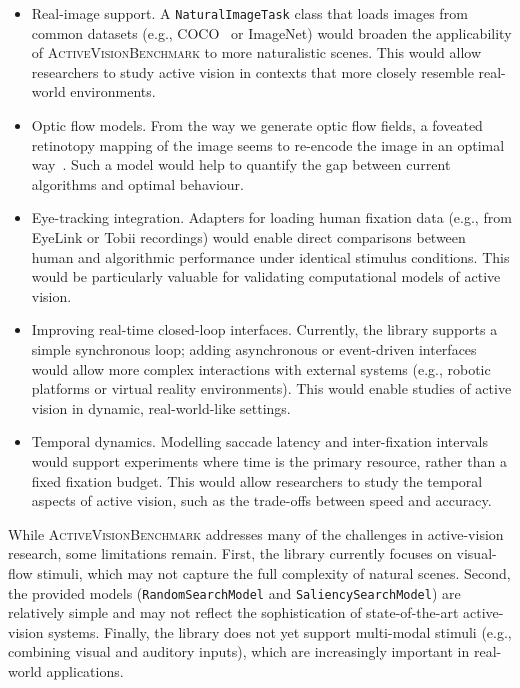 \documentclass[12pt,a4paper]{article}
\newcommand{\avb}{\textsc{ActiveVisionBenchmark}}  %
\begin{document}
\begin{itemize}
    \item Real-image support. A \texttt{NaturalImageTask} class that loads images from common datasets (e.g., COCO~\parencite{Lin2014} or ImageNet) would broaden the applicability of \avb{} to more naturalistic scenes. This would allow researchers to study active vision in contexts that more closely resemble real-world environments.

    \item Optic flow models. From the way we generate optic flow fields, a foveated retinotopy mapping of the image seems to re-encode the image in an optimal way~\parencite{Jeremie2025}. Such a model would help to quantify the gap between current algorithms and optimal behaviour.

    \item Eye-tracking integration. Adapters for loading human fixation data (e.g., from EyeLink or Tobii recordings) would enable direct comparisons between human and algorithmic performance under identical stimulus conditions. This would be particularly valuable for validating computational models of active vision.

    \item Improving real-time closed-loop interfaces. Currently, the library supports a simple synchronous loop; adding asynchronous or event-driven interfaces would allow more complex interactions with external systems (e.g., robotic platforms or virtual reality environments). This would enable studies of active vision in dynamic, real-world-like settings.

    \item Temporal dynamics. Modelling saccade latency and inter-fixation intervals would support experiments where time is the primary resource, rather than a fixed fixation budget. This would allow researchers to study the temporal aspects of active vision, such as the trade-offs between speed and accuracy.
\end{itemize}

While \avb{} addresses many of the challenges in active-vision research, some limitations remain. First, the library currently focuses on visual-flow stimuli, which may not capture the full complexity of natural scenes. Second, the provided models (\texttt{RandomSearchModel} and \texttt{SaliencySearchModel}) are relatively simple and may not reflect the sophistication of state-of-the-art active-vision systems. Finally, the library does not yet support multi-modal stimuli (e.g., combining visual and auditory inputs), which are increasingly important in real-world applications.
\end{document}
